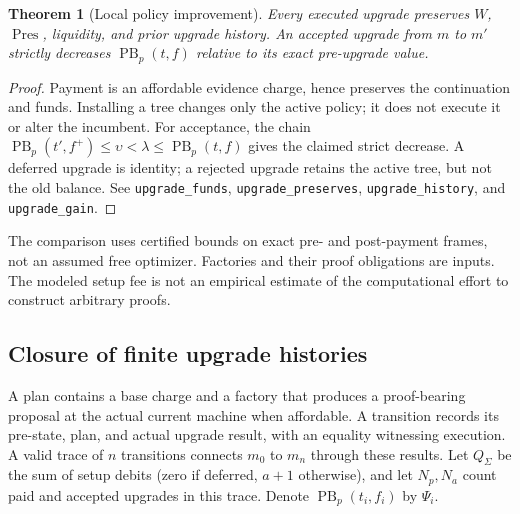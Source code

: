 \documentclass[10pt,letterpaper]{article}
\newtheorem{theorem}{Theorem}[section]
\newcommand{\PB}{\operatorname{PB}}
\newcommand{\Pres}{\operatorname{Pres}}
\newcommand{\rc}[1]{\texttt{#1}}
\begin{document}
\begin{theorem}[Local policy improvement]\label{thm:policy-local}
Every executed upgrade preserves $W$, $\Pres$, liquidity, and prior upgrade history. An accepted upgrade from $m$ to $m'$ strictly decreases $\PB_p(t,f)$ relative to its exact pre-upgrade value.
\end{theorem}
\begin{proof}
Payment is an affordable evidence charge, hence preserves the continuation and funds. Installing a tree changes only the active policy; it does not execute it or alter the incumbent. For acceptance, the chain $\PB_p(t',f^+)\le\upsilon<\lambda\le\PB_p(t,f)$ gives the claimed strict decrease. A deferred upgrade is identity; a rejected upgrade retains the active tree, but not the old balance. See \rc{upgrade\_funds}, \rc{upgrade\_preserves}, \rc{upgrade\_history}, and \rc{upgrade\_gain}.
\end{proof}
The comparison uses certified bounds on exact pre- and post-payment frames, not an assumed free optimizer. Factories and their proof obligations are inputs. The modeled setup fee is not an empirical estimate of the computational effort to construct arbitrary proofs.

\subsection{Closure of finite upgrade histories}
A plan contains a base charge and a factory that produces a proof-bearing proposal at the actual current machine when affordable. A transition records its pre-state, plan, and actual upgrade result, with an equality witnessing execution. A valid trace of $n$ transitions connects $m_0$ to $m_n$ through these results. Let $Q_\Sigma$ be the sum of setup debits (zero if deferred, $a+1$ otherwise), and let $N_p,N_a$ count paid and accepted upgrades in this trace. Denote $\PB_p(t_i,f_i)$ by $\Psi_i$.
\end{document}
